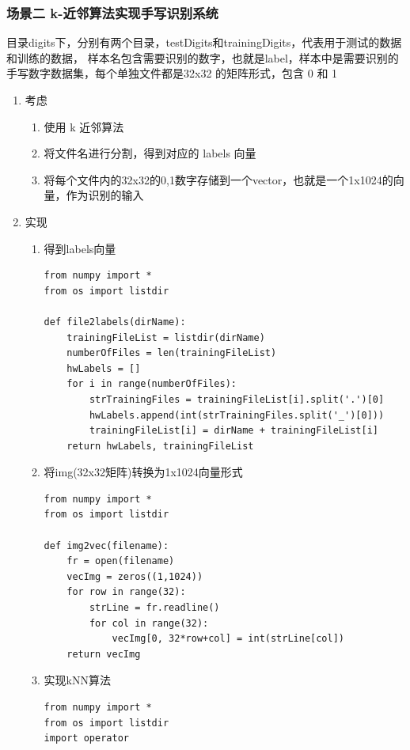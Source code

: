 \documentclass[11pt]{ctexart}
\begin{document}
\subsubsection{场景二 k-近邻算法实现手写识别系统}
\label{sec:orgheadline9}
目录digits下，分别有两个目录，testDigits和trainingDigits，代表用于测试的数据和训练的数据，
样本名包含需要识别的数字，也就是label，样本中是需要识别的手写数字数据集，每个单独文件都是32x32
的矩阵形式，包含 0 和 1
\begin{enumerate}
\item 考虑
\label{sec:orgheadline6}
\begin{enumerate}
\item 使用 k 近邻算法
\item 将文件名进行分割，得到对应的 labels 向量
\item 将每个文件内的32x32的0,1数字存储到一个vector，也就是一个1x1024的向量，作为识别的输入
\end{enumerate}
\item 实现
\label{sec:orgheadline7}
\begin{enumerate}
\item 得到labels向量
\lstset{language=Python,label= ,caption= ,captionpos=b,numbers=none}
\begin{lstlisting}
from numpy import *
from os import listdir

def file2labels(dirName):
    trainingFileList = listdir(dirName)
    numberOfFiles = len(trainingFileList)
    hwLabels = []
    for i in range(numberOfFiles):
        strTrainingFiles = trainingFileList[i].split('.')[0]
        hwLabels.append(int(strTrainingFiles.split('_')[0]))
        trainingFileList[i] = dirName + trainingFileList[i]
    return hwLabels, trainingFileList
\end{lstlisting}
\item 将img(32x32矩阵)转换为1x1024向量形式
\lstset{language=Python,label= ,caption= ,captionpos=b,numbers=none}
\begin{lstlisting}
from numpy import *
from os import listdir

def img2vec(filename):
    fr = open(filename)
    vecImg = zeros((1,1024))
    for row in range(32):
        strLine = fr.readline()
        for col in range(32):
            vecImg[0, 32*row+col] = int(strLine[col])
    return vecImg
\end{lstlisting}
\item 实现kNN算法
\lstset{language=Python,label= ,caption= ,captionpos=b,numbers=none}
\begin{lstlisting}
from numpy import *
from os import listdir
import operator


\end{lstlisting}
\end{enumerate}
\end{enumerate}
\end{document}
